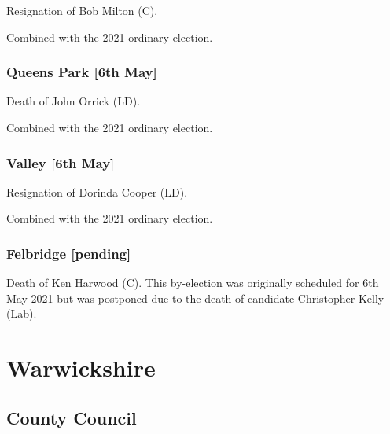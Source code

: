 \documentclass[a4paper,openany]{book}
\begin{document}
\begin{resultsiii}

Resignation of Bob Milton (C).

Combined with the 2021 ordinary election.

\subsubsection*{Queens Park \hspace*{\fill}\nolinebreak[1]%
	\enspace\hspace*{\fill}
	[6th May]}


Death of John Orrick (LD).

Combined with the 2021 ordinary election.

\subsubsection*{Valley \hspace*{\fill}\nolinebreak[1]%
	\enspace\hspace*{\fill}
	[6th May]}


Resignation of Dorinda Cooper (LD).

Combined with the 2021 ordinary election.

\subsubsection*{Felbridge \hspace*{\fill}\nolinebreak[1]%
	\enspace\hspace*{\fill}
	[pending]}


Death of Ken Harwood (C).  This by-election was originally scheduled for 6th May 2021 but was postponed due to the death of candidate Christopher Kelly (Lab).

\section{Warwickshire}

\subsection*{County Council}


\end{resultsiii}
\end{document}
